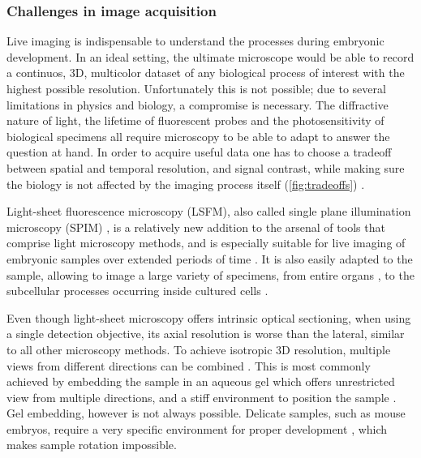 \documentclass{booklet_style}
\begin{document}
\subsubsection{Challenges in image acquisition}
Live imaging is indispensable to understand the processes during embryonic development. In an ideal setting, the ultimate microscope would be able to record a continuos, 3D, multicolor dataset of any biological process of interest with the highest possible resolution. Unfortunately this is not possible; due to several limitations in physics and biology, a compromise is necessary. The diffractive nature of light, the lifetime of fluorescent probes and the photosensitivity of biological specimens all require microscopy to be able to adapt to answer the question at hand. In order to acquire useful data one has to choose a tradeoff between spatial and temporal resolution, and signal contrast, while making sure the biology is not affected by the imaging process itself (\autoref{fig:tradeoffs}) \cite{laissue_assessing_2017}.

Light-sheet fluorescence microscopy (LSFM), also called single plane illumination microscopy (SPIM) \cite{huisken_optical_2004}, is a relatively new addition to the arsenal of tools that comprise light microscopy methods, and is especially suitable for live imaging of embryonic samples over extended periods of time \cite{keller_quantitative_2008, huisken_selective_2009, weber_light_2011,tomer_shedding_2011}. It is also easily adapted to the sample, allowing to image a large variety of specimens, from entire organs \cite{dodt_ultramicroscopy:_2007}, to the subcellular processes occurring inside cultured cells \cite{chen_lattice_2014}.

Even though light-sheet microscopy offers intrinsic optical sectioning, when using a single detection objective, its axial resolution is worse than the lateral, similar to all other microscopy methods.
To achieve isotropic 3D resolution, multiple views from different directions can be combined \cite{preibisch_efficient_2014}. This is most commonly achieved by embedding the sample in an aqueous gel which offers unrestricted view from multiple directions, and a stiff environment to position the sample \cite{krzic_multiview_2012}. Gel embedding, however is not always possible. Delicate samples, such as mouse embryos, require a very specific environment for proper development \cite{doherty_culture_2000}, which makes sample rotation impossible.
\end{document}

